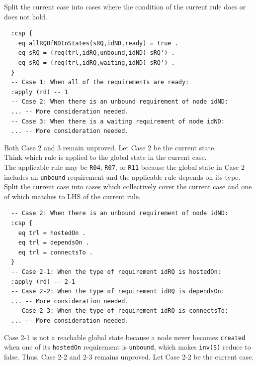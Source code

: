 \documentclass[12pt]{report}
\newcommand{\stt}[1]{{\small{\tt {#1}}}}
\begin{document}
 Split the current case into cases where
the condition of the current rule does or does not hold.
\small
\begin{verbatim}
  :csp { 
    eq allRQOfNDInStates(sRQ,idND,ready) = true .
    eq sRQ = (req(trl,idRQ,unbound,idND) sRQ') .
    eq sRQ = (req(trl,idRQ,waiting,idND) sRQ') .
  }
  -- Case 1: When all of the requirements are ready:
  :apply (rd) -- 1
  -- Case 2: When there is an unbound requirement of node idND:
  ... -- More consideration needed.
  -- Case 3: When there is a waiting requirement of node idND:
  ... -- More consideration needed.
\end{verbatim}
\normalsize
Both Case 2 and 3 remain unproved. Let Case 2 be the current state.\\

 Think which rule is applied to the 
global state in the current case. \\
The applicable rule may be {\tt R04}, {\tt R07}, or {\tt R11} because
the global state in Case 2 includes an {\tt unbound} requirement and
the applicable rule depends on its type.\\

 Split the current case into cases which
collectively cover the current case and one of which matches to LHS of
the current rule. \\ 
\small
\begin{verbatim}
  -- Case 2: When there is an unbound requirement of node idND:
  :csp {
    eq trl = hostedOn .
    eq trl = dependsOn .
    eq trl = connectsTo .
  }
  -- Case 2-1: When the type of requirement idRQ is hostedOn:
  :apply (rd) -- 2-1
  -- Case 2-2: When the type of requirement idRQ is dependsOn:
  ... -- More consideration needed.
  -- Case 2-3: When the type of requirement idRQ is connectsTo:
  ... -- More consideration needed.
\end{verbatim}
\normalsize
Case 2-1 is not a reachable global state because a node never
becomes {\tt created} when one of its {\tt hostedOn} requirement is
{\tt unbound}, which makes \stt{inv(S)} reduce to false.
Thus, Case 2-2 and 2-3 remains unproved. Let Case 2-2 be the current case.\\
\end{document}
